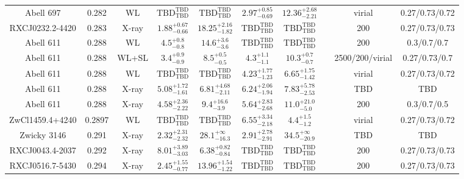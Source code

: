 \begin{table}
\begin{tabular}{cccccccccc}
Abell 697 & 0.282 & WL & ${\mathrm{TBD}}^{\mathrm{TBD}}_{\mathrm{TBD}}$ & ${\mathrm{TBD}}^{\mathrm{TBD}}_{\mathrm{TBD}}$ & ${2.97}^{+0.85}_{-0.69}$ & ${12.36}^{+2.68}_{-2.21}$ & \citet{OK10.1} & virial & 0.27/0.73/0.72 \\
RXCJ0232.2-4420 & 0.283 & X-ray & ${1.88}^{+0.67}_{-0.66}$ & ${18.25}^{+2.16}_{-1.82}$ & ${\mathrm{TBD}}^{\mathrm{TBD}}_{\mathrm{TBD}}$ & ${\mathrm{TBD}}^{\mathrm{TBD}}_{\mathrm{TBD}}$ & \citet{BA14.1} & 200 & 0.27/0.73/0.73 \\
Abell 611 & 0.288 & WL & ${4.5}^{+0.8}_{-0.8}$ & ${14.6}^{+3.6}_{-3.6}$ & ${\mathrm{TBD}}^{\mathrm{TBD}}_{\mathrm{TBD}}$ & ${\mathrm{TBD}}^{\mathrm{TBD}}_{\mathrm{TBD}}$ & \citet{SE14.1} & 200 & 0.3/0.7/0.7 \\
Abell 611 & 0.288 & WL+SL & ${3.4}^{+0.9}_{-0.9}$ & ${8.5}^{+0.5}_{-0.5}$ & ${4.3}^{+1.1}_{-1.1}$ & ${10.3}^{+0.7}_{-0.7}$ & \citet{ME14.1} & 2500/200/virial & 0.27/0.73/0.7 \\
Abell 611 & 0.288 & WL & ${\mathrm{TBD}}^{\mathrm{TBD}}_{\mathrm{TBD}}$ & ${\mathrm{TBD}}^{\mathrm{TBD}}_{\mathrm{TBD}}$ & ${4.23}^{+1.77}_{-1.23}$ & ${6.65}^{+1.75}_{-1.42}$ & \citet{OK10.1} & virial & 0.27/0.73/0.72 \\
Abell 611 & 0.288 & X-ray & ${5.08}^{+1.72}_{-1.61}$ & ${6.81}^{+4.68}_{-2.11}$ & ${6.24}^{+2.06}_{-1.94}$ & ${7.83}^{+5.78}_{-2.53}$ & \citet{SC06.1} & TBD & TBD \\
Abell 611 & 0.288 & X-ray & ${4.58}^{+2.36}_{-2.22}$ & ${9.4}^{+16.6}_{-3.9}$ & ${5.64}^{+2.83}_{-2.68}$ & ${11.0}^{+21.0}_{-5.0}$ & \citet{AL03.1} & 200 & 0.3/0.7/0.5 \\
ZwCl1459.4+4240 & 0.2897 & WL & ${\mathrm{TBD}}^{\mathrm{TBD}}_{\mathrm{TBD}}$ & ${\mathrm{TBD}}^{\mathrm{TBD}}_{\mathrm{TBD}}$ & ${6.55}^{+3.34}_{-2.18}$ & ${4.4}^{+1.5}_{-1.2}$ & \citet{OK10.1} & virial & 0.27/0.73/0.72 \\
Zwicky 3146 & 0.291 & X-ray & ${2.32}^{+2.31}_{-2.32}$ & ${28.1}^{+\infty}_{-16.3}$ & ${2.91}^{+2.78}_{-2.91}$ & ${34.5}^{+\infty}_{-20.9}$ & \citet{SC06.1} & TBD & TBD \\
RXCJ0043.4-2037 & 0.292 & X-ray & ${8.01}^{+3.89}_{-3.03}$ & ${6.38}^{+0.82}_{-0.84}$ & ${\mathrm{TBD}}^{\mathrm{TBD}}_{\mathrm{TBD}}$ & ${\mathrm{TBD}}^{\mathrm{TBD}}_{\mathrm{TBD}}$ & \citet{BA14.1} & 200 & 0.27/0.73/0.73 \\
RXCJ0516.7-5430 & 0.294 & X-ray & ${2.45}^{+1.55}_{-0.77}$ & ${13.96}^{+1.54}_{-1.22}$ & ${\mathrm{TBD}}^{\mathrm{TBD}}_{\mathrm{TBD}}$ & ${\mathrm{TBD}}^{\mathrm{TBD}}_{\mathrm{TBD}}$ & \citet{BA14.1} & 200 & 0.27/0.73/0.73 \\

\end{tabular}
\end{table}
